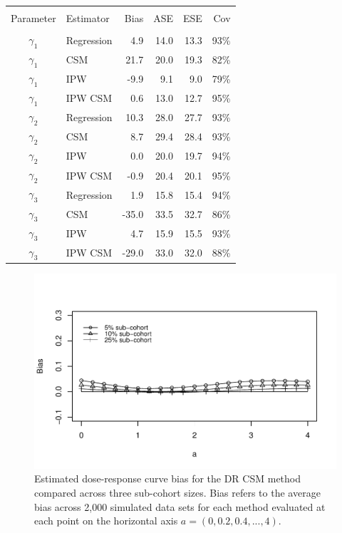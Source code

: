 \documentclass[12pt]{article}
\newcounter{tblcap}
\def\tblhead#1{\hline\\[-9pt]#1\\\hline\\[-9.75pt]}
\def\lastline{\\\hline}
\begin{document}
\newpage

\begin{table}[h]
{\tabcolsep=4.25pt
\begin{tabular}{@{}clrrrr@{}}
       \tblhead{Parameter & Estimator & Bias & ASE & ESE & Cov}
$\gamma_{1}$ & Regression & 4.9 & 14.0 & 13.3 & 93\% \\
$\gamma_{1}$ & CSM & 21.7 & 20.0 & 19.3 & 82\% \\
$\gamma_{1}$ & IPW & -9.9 & 9.1 & 9.0 & 79\% \\
$\gamma_{1}$ & IPW CSM & 0.6 & 13.0 & 12.7 & 95\% \\[4pt]
$\gamma_{2}$ & Regression & 10.3 & 28.0 & 27.7 & 93\% \\
$\gamma_{2}$ & CSM & 8.7 & 29.4 & 28.4 & 93\% \\
$\gamma_{2}$ & IPW & 0.0 & 20.0 & 19.7 & 94\% \\
$\gamma_{2}$ & IPW CSM & -0.9 & 20.4 & 20.1 & 95\% \\[4pt]
$\gamma_{3}$ & Regression & 1.9 & 15.8 & 15.4 & 94\% \\
$\gamma_{3}$ & CSM & -35.0 & 33.5 & 32.7 & 86\% \\
$\gamma_{3}$ & IPW & 4.7 & 15.9 & 15.5 & 93\% \\
$\gamma_{3}$ & IPW CSM & -29.0 & 33.0 & 32.0 & 88\%
         \lastline
    \end{tabular}}
\end{table}

\newpage

\begin{figure}
\centering
\includegraphics[width=6in]{app_fig1.pdf}
\caption{Estimated dose-response curve bias for the DR CSM method compared across three sub-cohort sizes. Bias refers to the average bias across 2,000 simulated data sets for each method evaluated at each point on the horizontal axis $a = (0, 0.2, 0.4, ..., 4)$.}
\end{figure}
\end{document}
